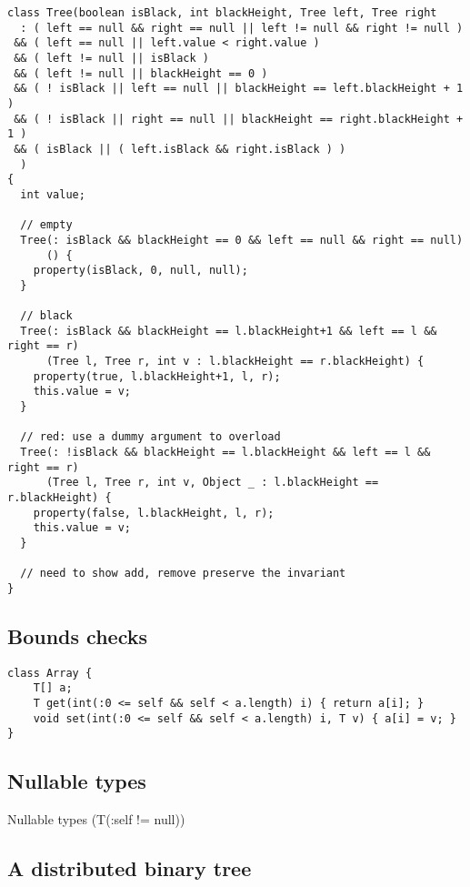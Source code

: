 \begin{verbatim}
class Tree(boolean isBlack, int blackHeight, Tree left, Tree right
  : ( left == null && right == null || left != null && right != null )
 && ( left == null || left.value < right.value )
 && ( left != null || isBlack )
 && ( left != null || blackHeight == 0 )
 && ( ! isBlack || left == null || blackHeight == left.blackHeight + 1 )
 && ( ! isBlack || right == null || blackHeight == right.blackHeight + 1 )
 && ( isBlack || ( left.isBlack && right.isBlack ) )
  )
{
  int value;

  // empty
  Tree(: isBlack && blackHeight == 0 && left == null && right == null)
      () {
    property(isBlack, 0, null, null);
  }

  // black
  Tree(: isBlack && blackHeight == l.blackHeight+1 && left == l && right == r)
      (Tree l, Tree r, int v : l.blackHeight == r.blackHeight) {
    property(true, l.blackHeight+1, l, r);
    this.value = v;
  }
      
  // red: use a dummy argument to overload
  Tree(: !isBlack && blackHeight == l.blackHeight && left == l && right == r)
      (Tree l, Tree r, int v, Object _ : l.blackHeight == r.blackHeight) {
    property(false, l.blackHeight, l, r);
    this.value = v;
  }

  // need to show add, remove preserve the invariant
}
\end{verbatim}

\subsection{Bounds checks}

\begin{verbatim}
class Array {
    T[] a;
    T get(int(:0 <= self && self < a.length) i) { return a[i]; }
    void set(int(:0 <= self && self < a.length) i, T v) { a[i] = v; }
}
\end{verbatim}

\subsection{Nullable types}

Nullable types (T(:self != null))


\subsection{A distributed binary tree}

\begin{figure}

\end{figure}

